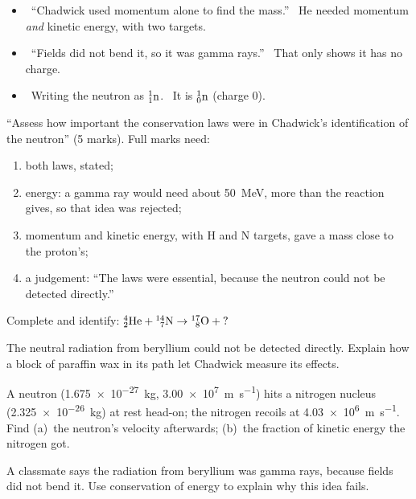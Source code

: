 \begin{mistakes}
\begin{itemize}
  \item \xmark\ ``Chadwick used momentum alone to find the mass.'' \cmark\ He
        needed momentum \emph{and} kinetic energy, with two targets.
  \item \xmark\ ``Fields did not bend it, so it was gamma rays.'' \cmark\ That only
        shows it has no charge.
  \item \xmark\ Writing the neutron as $\chTwoNuc{1}{1}{n}$. \cmark\ It is
        $\chTwoNuc{1}{0}{n}$ (charge 0).
\end{itemize}
\end{mistakes}

\begin{examtip}
``Assess how important the conservation laws were in Chadwick's identification
of the neutron'' (5 marks). Full marks need:
\begin{enumerate}
  \item both laws, stated;
  \item energy: a gamma ray would need about \qty{50}{MeV}, more than the
        reaction gives, so that idea was rejected;
  \item momentum and kinetic energy, with H and N targets, gave a mass close to
        the proton's;
  \item a judgement: ``The laws were essential, because the neutron could not be
        detected directly.''
\end{enumerate}
\end{examtip}

\begin{quickcheck}
  \item Complete and identify:
        $\chTwoNuc{4}{2}{He} + \chTwoNuc{14}{7}{N} \rightarrow \chTwoNuc{17}{8}{O} + {?}$
  \item The neutral radiation from beryllium could not be detected directly.
        Explain how a block of paraffin wax in its path let Chadwick measure its effects.
  \item A neutron (\qty{1.675e-27}{kg}, \qty{3.00e7}{m.s^{-1}}) hits a nitrogen
        nucleus (\qty{2.325e-26}{kg}) at rest head-on; the nitrogen recoils at
        \qty{4.03e6}{m.s^{-1}}. Find (a)~the neutron's velocity afterwards;
        (b)~the fraction of kinetic energy the nitrogen got.
  \item A classmate says the radiation from beryllium was gamma rays, because
        fields did not bend it. Use conservation of energy to explain why this
        idea fails.
\end{quickcheck}

